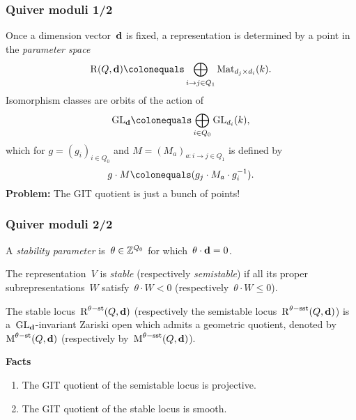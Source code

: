 \documentclass{beamer}
\begin{document}
\begin{frame}
    \frametitle{Quiver moduli 1/2}
Once a dimension vector~$\mathbf{d}$ is fixed,
a representation is determined by a point in the \emph{parameter space}
\[\parameterspace(Q, \tuple{d}) \colonequals \bigoplus_{i \to j \in Q_1} \Mat_{d_j \times d_i}(k).\]
\pause
Isomorphism classes are orbits of the action of
\[{\GL}_{\tuple{d}} \colonequals \bigoplus_{i \in Q_0} \GL_{d_i}(k),\]
which for $g = (g_i)_{i \in Q_0}$ and $M = (M_{a})_{a : i \to j \in Q_1}$ is defined by
\[g \cdot M \colonequals (g_j \cdot M_{a} \cdot g^{-1}_i).\] \pause
{\bf Problem: } The GIT quotient is just a bunch of points!
\end{frame}
\begin{frame}
    \frametitle{Quiver moduli 2/2}
A \emph{stability parameter} is~$\theta \in \mathbb{Z}^{Q_0}$
for which~$\theta \cdot \mathbf{d} = 0$. \pause
\begin{definition}
The representation~$V$ is \emph{stable} (respectively \emph{semistable})
if all its proper subrepresentations~$W$ satisfy~$\theta \cdot W < 0$
(respectively~$\theta \cdot W \leq 0$).
\end{definition} \pause
\begin{theorem}
The stable locus~$\operatorname{R}^{\theta-\mathrm{st}}(Q, \mathbf{d})$
(respectively the semistable locus~$\operatorname{R}^{\theta-\mathrm{sst}}(Q, \mathbf{d})$)
is a~$\operatorname{GL}_{\mathbf{d}}$-invariant Zariski open which admits a geometric quotient,
denoted by~$\operatorname{M}^{\theta-\mathrm{st}}(Q, \mathbf{d})$
(respectively by~$\operatorname{M}^{\theta-\mathrm{sst}}(Q, \mathbf{d})$).
\end{theorem} \pause

{\bf Facts}
\begin{enumerate}
    \item The GIT quotient of the semistable locus is projective. \pause
    \item The GIT quotient of the stable locus is smooth.
\end{enumerate}
\end{frame}
\end{document}
